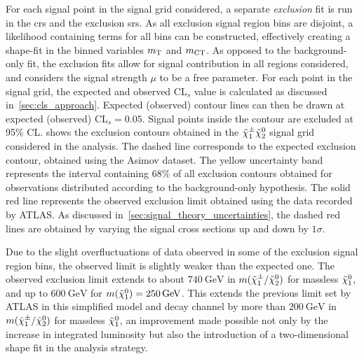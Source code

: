 For each signal point in the signal grid considered, a separate \textit{exclusion} fit is run in the \glspl{cr} and the exclusion \glspl{sr}. As all exclusion signal region bins are disjoint, a likelihood containing terms for all bins can be constructed, effectively creating a shape-fit in the binned variables $m_{\textrm{T}}$ and $m_{\textrm{CT}}$. As opposed to the background-only fit, the exclusion fits allow for signal contribution in all regions considered, and considers the signal strength $\mu$ to be a free parameter. For each point in the signal grid, the expected and observed CL$_s$ value is calculated as discussed in~\cref{sec:cls_approach}. Expected (observed) contour lines can then be drawn at expected (observed) CL$_s =0.05$. Signal points inside the contour are excluded at 95\% CL.  shows the exclusion contours obtained in the $\tilde{\chi}_1^\pm\tilde{\chi}_2^0$ signal grid considered in the analysis. The dashed line corresponds to the expected exclusion contour, obtained using the Asimov dataset. The yellow uncertainty band represents the interval containing 68\% of all exclusion contours obtained for observations distributed according to the background-only hypothesis. The solid red line represents the observed exclusion limit obtained using the data recorded by ATLAS. As discussed in~\cref{sec:signal_theory_uncertainties}, the dashed red lines are obtained by varying the signal cross sections up and down by $1\sigma$.

Due to the slight overfluctuations of data observed in some of the exclusion signal region bins, the observed limit is slightly weaker than the expected one. The observed exclusion limit extends to about $\SI{740}{\GeV}$ in $m(\tilde{\chi}_1^\pm/\tilde{\chi}_2^0)$ for massless $\tilde{\chi}_1^0$, and up to $\SI{600}{\GeV}$ for $m(\lsp)=\SI{250}{\GeV}$. This extends the previous limit set by ATLAS in this simplified model and decay channel by more than $\SI{200}{\GeV}$ in $m(\tilde{\chi}_1^\pm/\tilde{\chi}_2^0)$ for massless $\tilde{\chi}_1^0$, an improvement made possible not only by the increase in integrated luminosity but also the introduction of a two-dimensional shape fit in the analysis strategy. 

